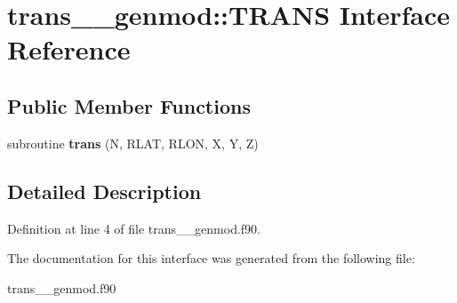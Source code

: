 \hypertarget{interfacetrans____genmod_1_1_t_r_a_n_s}{\section{trans\+\_\+\+\_\+genmod\+:\+:T\+R\+A\+N\+S Interface Reference}
\label{interfacetrans____genmod_1_1_t_r_a_n_s}
}
\subsection*{Public Member Functions}
\begin{DoxyCompactItemize}
\item 
\hypertarget{interfacetrans____genmod_1_1_t_r_a_n_s_a0f79b85c2bac6f68bd0e8ea07b6c91d9}{subroutine {\bfseries trans} (N, R\+L\+A\+T, R\+L\+O\+N, X, Y, Z)}\label{interfacetrans____genmod_1_1_t_r_a_n_s_a0f79b85c2bac6f68bd0e8ea07b6c91d9}

\end{DoxyCompactItemize}


\subsection{Detailed Description}


Definition at line 4 of file trans\+\_\+\+\_\+genmod.\+f90.



The documentation for this interface was generated from the following file\+:\begin{DoxyCompactItemize}
\item 
trans\+\_\+\+\_\+genmod.\+f90\end{DoxyCompactItemize}
